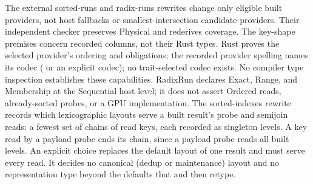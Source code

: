 The external sorted-runs and radix-runs rewrites change only eligible built
providers, not host fallbacks or smallest-intersection candidate providers.
Their independent checker preserves Physical and rederives coverage.
The key-shape premises concern recorded columns, not their Rust types.
Rust proves the selected provider's ordering and  obligations;
the recorded provider spelling names its codec ( or an explicit
codec); no trait-selected codec exists. No compiler type inspection establishes these capabilities.
RadixRun declares Exact, Range, and Membership at the Sequential host level;
it does not assert Ordered reads, already-sorted probes, or a GPU implementation.
The sorted-indexes rewrite records which lexicographic layouts serve a built
result's probe and semijoin reads: a fewest set of chains of read keys, each
recorded as singleton levels. A key read by a payload probe ends its chain,
since a payload probe reads all built levels. An explicit
 choice replaces the default layout of one result and
must serve every read. It decides no canonical (dedup or maintenance) layout
and no representation type beyond the defaults that  and
 then retype.

